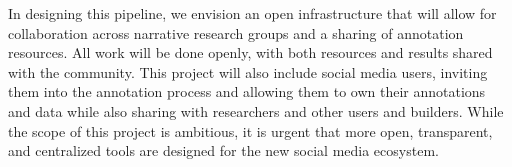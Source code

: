 \documentclass{article} %
\begin{document}


In designing this pipeline, we envision an open infrastructure that will allow for collaboration across narrative research groups and a sharing of annotation resources.
All work will be done openly, with both resources and results shared with the community.
This project will also include social media users, inviting them into the annotation process and allowing them to own their annotations and data while also sharing with researchers and other users and builders.
While the scope of this project is ambitious, it is urgent that more open, transparent, and centralized tools are designed for the new social media ecosystem.







\end{document}

